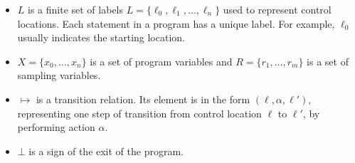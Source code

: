 \documentclass[sigconf,review, anonymous]{acmart}
\begin{document}
\begin{itemize}
\item $L$ is a finite set of labels $L=\{\ell_0,\ell_1,\dots,\ell_n\}$ used to represent control locations. Each statement in a program has a unique label. For example, $\ell_0$ usually indicates the starting location.

\item $X=\{x_0,\dots,x_n\}$ is a set of program variables and $R=\{r_1,\dots,r_m\}$ is a set of sampling variables.

\item $\mapsto$ is a transition relation. Its element is in the form $(\ell,\alpha,\ell')$, representing one step of transition from control location $\ell$ to $\ell'$, by performing action $\alpha$.

\item $\bot$ is a sign of the exit of the program.
\end{itemize}
\end{document}
